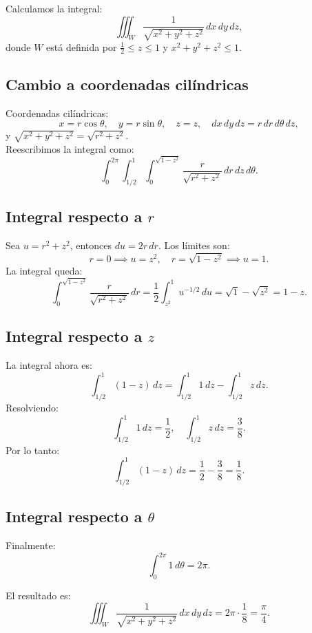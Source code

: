 	Calculamos la integral:
	\[
	\iiint_W \frac{1}{\sqrt{x^2 + y^2 + z^2}} \, dx\,dy\,dz,
	\]
	donde \(W\) está definida por \( \frac{1}{2} \leq z \leq 1 \) y \(x^2 + y^2 + z^2 \leq 1\).
	
	\subsection*{Cambio a coordenadas cilíndricas}
	Coordenadas cilíndricas:
	\[
	x = r\cos\theta, \quad y = r\sin\theta, \quad z = z, \quad dx\,dy\,dz = r \, dr\,d\theta\,dz,
	\]
	y \(\sqrt{x^2 + y^2 + z^2} = \sqrt{r^2 + z^2}\).\\
	
	Reescribimos la integral como:
	\[
	\int_0^{2\pi} \int_{1/2}^1 \int_0^{\sqrt{1-z^2}} \frac{r}{\sqrt{r^2 + z^2}} \, dr\,dz\,d\theta.
	\]
	
	\subsection*{Integral respecto a \(r\)}
	Sea \( u = r^2 + z^2 \), entonces \( du = 2r \, dr \). Los límites son:
	\[
	r = 0 \implies u = z^2, \quad r = \sqrt{1-z^2} \implies u = 1.
	\]
	La integral queda:
	\[
	\int_0^{\sqrt{1-z^2}} \frac{r}{\sqrt{r^2 + z^2}} \, dr = \frac{1}{2} \int_{z^2}^1 u^{-1/2} \, du = \sqrt{1} - \sqrt{z^2} = 1 - z.
	\]
	
	\subsection*{Integral respecto a \(z\)}
	La integral ahora es:
	\[
	\int_{1/2}^1 (1 - z) \, dz = \int_{1/2}^1 1 \, dz - \int_{1/2}^1 z \, dz.
	\]
	Resolviendo:
	\[
	\int_{1/2}^1 1 \, dz = \frac{1}{2}, \quad \int_{1/2}^1 z \, dz = \frac{3}{8}.
	\]
	Por lo tanto:
	\[
	\int_{1/2}^1 (1 - z) \, dz = \frac{1}{2} - \frac{3}{8} = \frac{1}{8}.
	\]
	
	\subsection*{Integral respecto a \(\theta\)}
	Finalmente:
	\[
	\int_0^{2\pi} 1 \, d\theta = 2\pi.
	\]
	
	El resultado es:
	\[
	\iiint_W \frac{1}{\sqrt{x^2 + y^2 + z^2}} \, dx\,dy\,dz = 2\pi \cdot \frac{1}{8} = \boxed{\frac{\pi}{4}}.
	\]
